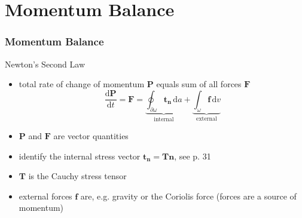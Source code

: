 \documentclass[hide notes,intlimits]{beamer}
\begin{document}
\section{Momentum Balance}

\begin{frame}
  \frametitle{Momentum Balance}
  Newton's Second Law
  \begin{itemize}
    \item total rate of change of momentum $\mathbf{P}$ equals sum of all forces $\mathbf{F}$
    \begin{equation}
      \frac{\text{d} \mathbf{P}}{\text{d} t} = \mathbf{F} = \underbrace{\oint_{\partial \omega} \mathbf{t}_{\mathbf{n}} \, \text{d} a}_{\text{internal}} +\underbrace{\int_{\omega} \mathbf{f} \, \text{d} v}_{\text{external}}
    \end{equation}
    \item $\mathbf{P}$ and $\mathbf{F}$ are vector quantities
    \item identify the internal stress vector $\mathbf{t}_{\mathbf{n}} = \mathbf{T}\mathbf{n}$, see p. 31
    \item $\mathbf{T}$ is the \alert{Cauchy stress tensor}
    \item external forces $\mathbf{f}$ are, e.g. gravity or the Coriolis force (forces are a source of momentum)
    \end{itemize}    
  \end{frame}
\end{document}
